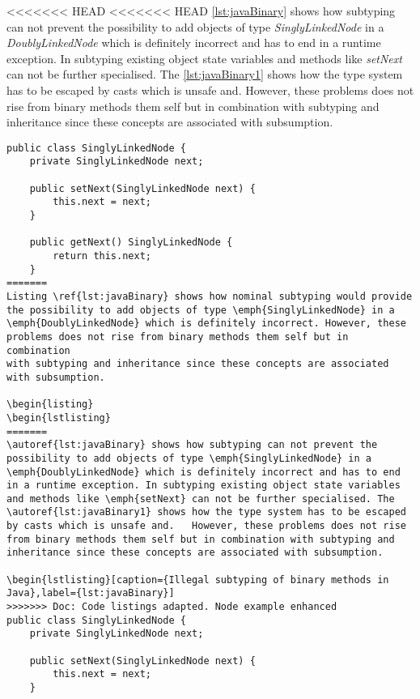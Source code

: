 <<<<<<< HEAD
<<<<<<< HEAD
\autoref{lst:javaBinary} shows how subtyping can not prevent the
possibility to add objects of type \emph{SinglyLinkedNode} in a
\emph{DoublyLinkedNode} which is definitely incorrect and has to end
in a runtime exception. In subtyping existing object state variables
and methods like \emph{setNext} can not be further specialised. The
\autoref{lst:javaBinary1} shows how the type system has to be escaped
by casts which is unsafe and.	However, these problems does not rise
from binary methods them self but in combination with subtyping and
inheritance since these concepts are associated with subsumption.

\begin{lstlisting}[caption={Illegal subtyping of binary methods in Java},label={lst:javaBinary}]
public class SinglyLinkedNode {
	private SinglyLinkedNode next;

	public setNext(SinglyLinkedNode next) {
		this.next = next;
	}

	public getNext() SinglyLinkedNode {
		return this.next;
	}
=======
Listing \ref{lst:javaBinary} shows how nominal subtyping would provide
the possibility to add objects of type \emph{SinglyLinkedNode} in a
\emph{DoublyLinkedNode} which is definitely incorrect. However, these
problems does not rise from binary methods them self but in combination
with subtyping and inheritance since these concepts are associated
with subsumption.

\begin{listing}
\begin{lstlisting}
=======
\autoref{lst:javaBinary} shows how subtyping can not prevent the
possibility to add objects of type \emph{SinglyLinkedNode} in a
\emph{DoublyLinkedNode} which is definitely incorrect and has to end
in a runtime exception. In subtyping existing object state variables
and methods like \emph{setNext} can not be further specialised. The
\autoref{lst:javaBinary1} shows how the type system has to be escaped
by casts which is unsafe and.	However, these problems does not rise
from binary methods them self but in combination with subtyping and
inheritance since these concepts are associated with subsumption.

\begin{lstlisting}[caption={Illegal subtyping of binary methods in Java},label={lst:javaBinary}]
>>>>>>> Doc: Code listings adapted. Node example enhanced
public class SinglyLinkedNode {
	private SinglyLinkedNode next;

	public setNext(SinglyLinkedNode next) {
		this.next = next;
	}


\end{lstlisting}
